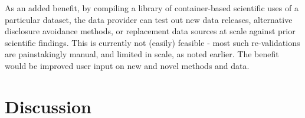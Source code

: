 \documentclass[inline]{hdsr}
\begin{document}
As an added benefit, by compiling a library of container-based scientific uses of a particular dataset, the data provider can test out new data releases, alternative disclosure avoidance methods, or replacement data sources  at scale against prior scientific findings. This is currently not (easily) feasible - most such re-validations are painstakingly manual, and limited in scale, as noted earlier. The benefit would be improved user input on new and novel methods and data.


\section{Discussion}


\end{document}
